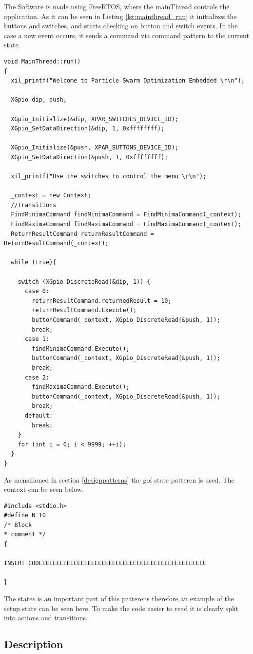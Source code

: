 The Software is made using FreeRTOS, where the mainThread controls the application. As it can be seen in Listing \ref{lst:mainthread_run} it initializes the buttons and switches, and starts checking on button and switch events. In the case a new event occurs, it sends a command via command pattern to the current state.

\begin{lstlisting}[style=customc++, label={lst:mainthread_run}, caption={MainThread run thread.}]
void MainThread::run()
{
  xil_printf("Welcome to Particle Swarm Optimization Embedded \r\n");

  XGpio dip, push;

  XGpio_Initialize(&dip, XPAR_SWITCHES_DEVICE_ID);
  XGpio_SetDataDirection(&dip, 1, 0xffffffff);

  XGpio_Initialize(&push, XPAR_BUTTONS_DEVICE_ID);
  XGpio_SetDataDirection(&push, 1, 0xffffffff);

  xil_printf("Use the switches to control the menu \r\n");

  _context = new Context;
  //Transitions
  FindMinimaCommand findMinimaCommand = FindMinimaCommand(_context);
  FindMaximaCommand findMaximaCommand = FindMaximaCommand(_context);
  ReturnResultCommand returnResultCommand = ReturnResultCommand(_context);

  while (true){

    switch (XGpio_DiscreteRead(&dip, 1)) {
      case 0:
        returnResultCommand.returnedResult = 10;
        returnResultCommand.Execute();
        buttonCommand(_context, XGpio_DiscreteRead(&push, 1));
        break;
      case 1:
        findMinimaCommand.Execute();
        buttonCommand(_context, XGpio_DiscreteRead(&push, 1));
        break;
      case 2:
        findMaximaCommand.Execute();
        buttonCommand(_context, XGpio_DiscreteRead(&push, 1));
        break;
      default:
        break;
    }
    for (int i = 0; i < 9999; ++i);
  }
}
\end{lstlisting}

As menshioned in section \ref{designpatterns} the gof state patteren is used. The context can be seen below.
\begin{lstlisting}[style=customc++, label={lst:listingExample}, caption={Example listing.}]
#include <stdio.h>
#define N 10
/* Block
* comment */
{

INSERT CODEEEEEEEEEEEEEEEEEEEEEEEEEEEEEEEEEEEEEEEEEEEEEEEE

}
\end{lstlisting}

The states is an important part of this patterens therefore an example of the setup state can be seen here. To make the code easier to read it is clearly split into actions and transitions. 


\subsection{Description}

\noindent{}